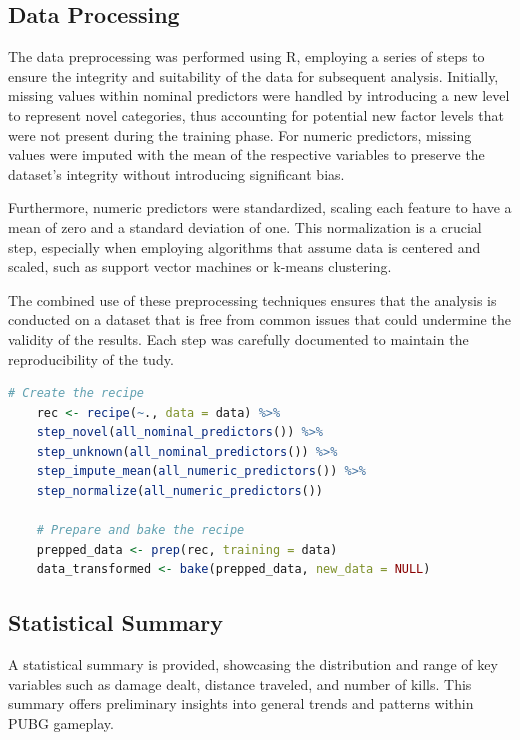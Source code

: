 \documentclass[12pt]{article}
\begin{document}
\subsection{Data Processing}

The data preprocessing was performed using R, employing a series of steps to ensure the integrity and suitability of the data for subsequent analysis. Initially, missing values within nominal predictors were handled by introducing a new level to represent novel categories, thus accounting for potential new factor levels that were not present during the training phase. For numeric predictors, missing values were imputed with the mean of the respective variables to preserve the dataset's integrity without introducing significant bias.

Furthermore, numeric predictors were standardized, scaling each feature to have a mean of zero and a standard deviation of one. This normalization is a crucial step, especially when employing algorithms that assume data is centered and scaled, such as support vector machines or k-means clustering.

The combined use of these preprocessing techniques ensures that the analysis is conducted on a dataset that is free from common issues that could undermine the validity of the results. Each step was carefully documented to maintain the reproducibility of the tudy.

\begin{lstlisting}[language=R, caption={R code for data preprocessing}, label={lst:datapreprocessing}]
	# Create the recipe
	rec <- recipe(~., data = data) %>%
	step_novel(all_nominal_predictors()) %>%
	step_unknown(all_nominal_predictors()) %>%
	step_impute_mean(all_numeric_predictors()) %>%
	step_normalize(all_numeric_predictors())
	
	# Prepare and bake the recipe
	prepped_data <- prep(rec, training = data)
	data_transformed <- bake(prepped_data, new_data = NULL)
\end{lstlisting}

\subsection{Statistical Summary}

A statistical summary is provided, showcasing the distribution and range of key variables such as damage dealt, distance traveled, and number of kills. This summary offers preliminary insights into general trends and patterns within PUBG gameplay.
\end{document}
